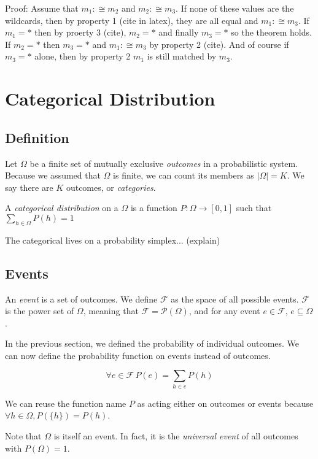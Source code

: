 \documentclass[twoside]{article}
\begin{document}
Proof: Assume that \(m_1 :\cong m_2\) and \(m_2 :\cong m_3\). If none of these values are the wildcards, then by property 1 (cite in latex), they are all equal and \(m_1 :\cong m_3\). If \(m_1 = \ast\) then by proerty 3 (cite), \(m_2 = \ast\) and finally \(m_3 = \ast\) so the theorem holds. If \(m_2 = \ast\) then \(m_3 = \ast\) and \(m_1 :\cong m_3\) by property 2 (cite). And of course if \(m_3 = \ast\) alone, then by property 2 \(m_1\) is still matched by \(m_3\).

\section{Categorical Distribution}

\subsection{Definition}

Let \(\Omega\) be a finite set of mutually exclusive \textit{outcomes} in a probabilistic system. Because we assumed that \(\Omega\) is finite, we can count its members as \(|\Omega| = K\). We say there are \(K\) outcomes, or \textit{categories}.

A \textit{categorical distribution} on a \(\Omega\) is a function \(P: \Omega \rightarrow [0, 1]\) such that \(\sum_{h \in \Omega} P(h) = 1\)

The categorical lives on a probability simplex... (explain)

\subsection{Events}

An \textit{event} is a set of outcomes. We define \(\mathcal{F}\) as the space of all possible events. \(\mathcal{F}\) is the power set of \(\Omega\), meaning that \(\mathcal{F} = \mathcal{P}(\Omega)\), and for any event \(e \in \mathcal{F}\), \(e \subseteq \Omega\).

In the previous section, we defined the probability of individual outcomes. We can now define the probability function on events instead of outcomes.

\[\forall e \in \mathcal{F}\, P(e) = \sum_{h \in e}{P({h})}\]

We can reuse the function name \(P\) as acting either on outcomes or events because \(\forall h \in \Omega, P(\{h\}) = P(h)\). 

Note that \(\Omega\) is itself an event. In fact, it is the \textit{universal event} of all outcomes with \(P(\Omega) = 1\).
\end{document}
